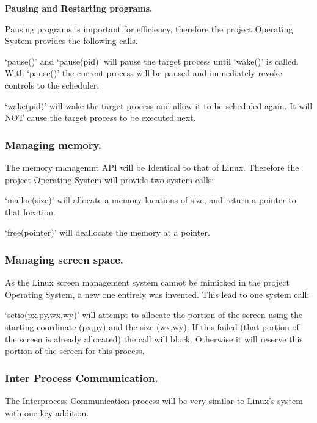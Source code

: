 \documentclass[a4paper]{report}
\begin{document}
\textbf{Pausing and Restarting programs.}

Pausing programs is important for efficiency, therefore the project Operating System provides the following calls.

`pause()' and `pause(pid)' will pause the target process until `wake()' is called. With `pause()' the current process will be paused and immediately revoke controls to the scheduler.

`wake(pid)' will wake the target process and allow it to be scheduled again. It will NOT cause the target process to be executed next.

\subsubsection*{Managing memory.}

The memory managemnt API will be Identical to that of Linux. Therefore the project Operating System will provide two system calls:

`malloc(size)' will allocate a memory locations of size, and return a pointer to that location.

`free(pointer)' will deallocate the memory at a pointer.

\subsubsection*{Managing screen space.}

As the Linux screen management system cannot be mimicked in the project Operating System, a new one entirely was invented. This lead to one system call:

`setio(px,py,wx,wy)' will attempt to allocate the portion of the screen using the starting coordinate (px,py) and the size (wx,wy). If this failed (that portion of the screen is already allocated) the call will block. Otherwise it will reserve this portion of the screen for this process.


\subsubsection*{Inter Process Communication.}

The Interprocess Communication process will be very similar to Linux's system with one key addition.
\end{document}
